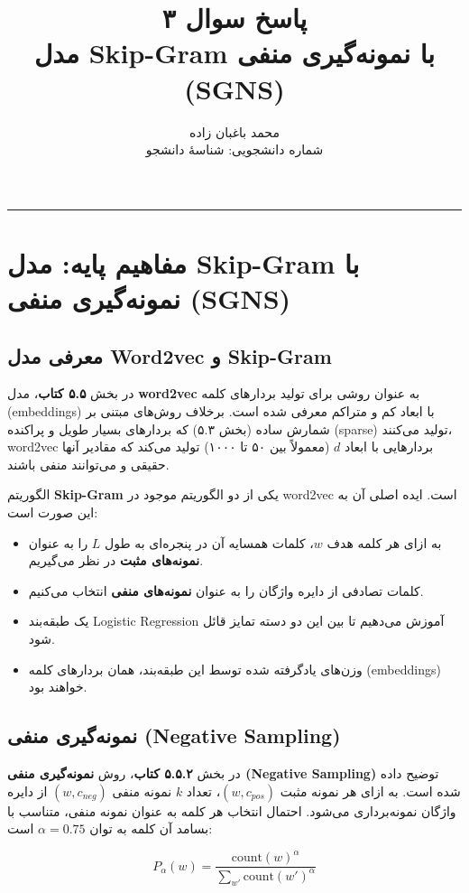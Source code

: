 \documentclass[11pt,a4paper]{article}
\title{\textbf{پاسخ سوال ۳} \\[0.4cm] \small مدل Skip-Gram با نمونه‌گیری منفی (SGNS)}
\author{محمد باغبان زاده \\ شماره دانشجویی: شناسهٔ دانشجو}
\date{}
\newcommand{\en}[1]{\textenglish{#1}}
\newcommand{\thickseparator}{\vspace{1em}\noindent\rule{\linewidth}{1pt}\vspace{1em}}
\begin{document}
\maketitle
\thickseparator

\section{مفاهیم پایه: مدل Skip-Gram با نمونه‌گیری منفی (SGNS)}

\subsection{معرفی مدل Word2vec و Skip-Gram}
در بخش \textbf{۵.۵ کتاب}، مدل \textbf{word2vec} به عنوان روشی برای تولید بردارهای کلمه (embeddings) با ابعاد کم و متراکم معرفی شده است. برخلاف روش‌های مبتنی بر شمارش ساده (بخش ۵.۳) که بردارهای بسیار طویل و پراکنده (sparse) تولید می‌کنند، word2vec بردارهایی با ابعاد \(d\) (معمولاً بین ۵۰ تا ۱۰۰۰) تولید می‌کند که مقادیر آنها حقیقی و می‌توانند منفی باشند.

الگوریتم \textbf{Skip-Gram} یکی از دو الگوریتم موجود در word2vec است. ایده اصلی آن به این صورت است:

\begin{itemize}
    \item به ازای هر کلمه هدف \(w\)، کلمات همسایه آن در پنجره‌ای به طول \(L\) را به عنوان \textbf{نمونه‌های مثبت} در نظر می‌گیریم.
    \item کلمات تصادفی از دایره واژگان را به عنوان \textbf{نمونه‌های منفی} انتخاب می‌کنیم.
    \item یک طبقه‌بند Logistic Regression آموزش می‌دهیم تا بین این دو دسته تمایز قائل شود.
    \item وزن‌های یادگرفته شده توسط این طبقه‌بند، همان بردارهای کلمه (embeddings) خواهند بود.
\end{itemize}

\subsection{نمونه‌گیری منفی \en{(Negative Sampling)}}
در بخش \textbf{۵.۵.۲ کتاب}، روش \textbf{نمونه‌گیری منفی \en{(Negative Sampling)}} توضیح داده شده است. به ازای هر نمونه مثبت \((w, c_{pos})\)، تعداد \(k\) نمونه منفی \((w, c_{neg})\) از دایره واژگان نمونه‌برداری می‌شود. احتمال انتخاب هر کلمه به عنوان نمونه منفی، متناسب با بسامد آن کلمه به توان \(\alpha = 0.75\) است:

\[
P_\alpha(w) = \frac{\text{count}(w)^\alpha}{\sum_{w'} \text{count}(w')^\alpha}
\]
\end{document}
